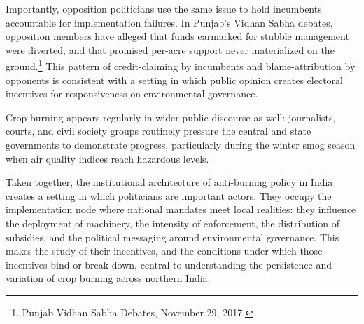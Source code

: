 \documentclass[12pt]{article}
\begin{document}
Importantly, opposition politicians use the same issue to hold incumbents accountable for implementation failures. In Punjab's Vidhan Sabha debates, opposition members have alleged that funds earmarked for stubble management were diverted, and that promised per-acre support never materialized on the ground.\footnote{Punjab Vidhan Sabha Debates, November 29, 2017.} This pattern of credit-claiming by incumbents and blame-attribution by opponents is consistent with a setting in which public opinion creates electoral incentives for responsiveness on environmental governance. 

Crop burning appears regularly in wider public discourse as well: journalists, courts, and civil society groups routinely pressure the central and state governments to demonstrate progress, particularly during the winter smog season when air quality indices reach hazardous levels.
 
Taken together, the institutional architecture of anti-burning policy in India creates a setting in which politicians are important actors. They occupy the implementation node where national mandates meet local realities: they influence the deployment of machinery, the intensity of enforcement, the distribution of subsidies, and the political messaging around environmental governance. This makes the study of their incentives, and the conditions under which those incentives bind or break down, central to understanding the persistence and variation of crop burning across northern India.
 
\end{document}

